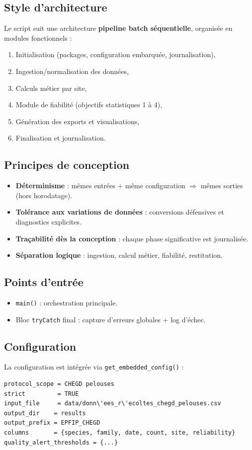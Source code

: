 \documentclass[11pt,a4paper]{article}
\begin{document}
\subsection{Style d'architecture}
Le script suit une architecture \textbf{pipeline batch s\'equentielle}, organis\'ee en modules fonctionnels :
\begin{enumerate}[leftmargin=1.2cm]
  \item Initialisation (packages, configuration embarqu\'ee, journalisation),
  \item Ingestion/normalisation des donn\'ees,
  \item Calculs m\'etier par site,
  \item Module de fiabilit\'e (objectifs statistiques 1 à 4),
  \item G\'en\'eration des exports et visualisations,
  \item Finalisation et journalisation.
\end{enumerate}

\subsection{Principes de conception}
\begin{itemize}[leftmargin=1.2cm]
  \item \textbf{D\'eterminisme} : mêmes entr\'ees + même configuration $\Rightarrow$ mêmes sorties (hors horodatage).
  \item \textbf{Tol\'erance aux variations de donn\'ees} : conversions d\'efensives et diagnostics explicites.
  \item \textbf{Traçabilit\'e dès la conception} : chaque phase significative est journalis\'ee.
  \item \textbf{S\'eparation logique} : ingestion, calcul m\'etier, fiabilit\'e, restitution.
\end{itemize}

\subsection{Points d'entr\'ee}
\begin{itemize}[leftmargin=1.2cm]
  \item \texttt{main()} : orchestration principale.
  \item Bloc \texttt{tryCatch} final : capture d'erreurs globales + log d'\'echec.
\end{itemize}

\subsection{Configuration}
La configuration est int\'egr\'ee via \texttt{get\_embedded\_config()} :
\begin{lstlisting}
protocol_scope = CHEGD pelouses
strict         = TRUE
input_file     = data/donn\'ees_r\'ecoltes_chegd_pelouses.csv
output_dir    = results
output_prefix = EPFIP_CHEGD
columns       = {species, family, date, count, site, reliability}
quality_alert_thresholds = {...}
\end{lstlisting}
\end{document}
